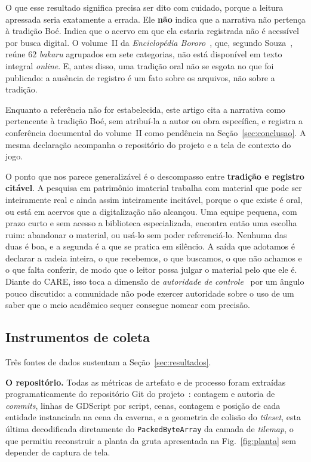 \documentclass[conference]{IEEEtran}
\begin{document}
O que esse resultado significa precisa ser dito com cuidado, porque a leitura apressada
seria exatamente a errada. Ele \textbf{não} indica que a narrativa não pertença à tradição
Boé. Indica que o acervo em que ela estaria registrada não é acessível por busca digital.
O volume~II da \textit{Enciclopédia Bororo}~\cite{albisetti1969}, que, segundo
Souza~\cite{souzabakaru}, reúne 62 \textit{bakaru} agrupados em sete categorias, não está
disponível em texto integral \textit{online}. E, antes disso, uma tradição oral não se
esgota no que foi publicado: a ausência de registro é um fato sobre os arquivos, não sobre
a tradição.

Enquanto a referência não for estabelecida, este artigo cita a narrativa como pertencente
à tradição Boé, sem atribuí-la a autor ou obra específica, e registra a conferência
documental do volume~II como pendência na Seção~\ref{sec:conclusao}. A mesma declaração
acompanha o repositório do projeto e a tela de contexto do jogo.

O ponto que nos parece generalizável é o descompasso entre \textbf{tradição e registro
citável}. A pesquisa em patrimônio imaterial trabalha com material que pode ser
inteiramente real e ainda assim inteiramente incitável, porque o que existe é oral, ou
está em acervos que a digitalização não alcançou. Uma equipe pequena, com prazo curto e
sem acesso a biblioteca especializada, encontra então uma escolha ruim: abandonar o
material, ou usá-lo sem poder referenciá-lo. Nenhuma das duas é boa, e a segunda é a que
se pratica em silêncio. A saída que adotamos é declarar a cadeia inteira, o que recebemos,
o que buscamos, o que não achamos e o que falta conferir, de modo que o leitor possa julgar
o material pelo que ele é. Diante do CARE, isso toca a dimensão de \textit{autoridade de
controle}~\cite{carroll2020} por um ângulo pouco discutido: a comunidade não pode exercer
autoridade sobre o uso de um saber que o meio acadêmico sequer consegue nomear com
precisão.

\subsection{Instrumentos de coleta}

Três fontes de dados sustentam a Seção~\ref{sec:resultados}.

\textbf{O repositório.} Todas as métricas de artefato e de processo foram extraídas
programaticamente do repositório Git do projeto~\cite{repo2026}: contagem e autoria de
\textit{commits}, linhas de GDScript por script, cenas, contagem e posição de cada
entidade instanciada na cena da caverna, e a geometria de colisão do \textit{tileset},
esta última decodificada diretamente do \texttt{PackedByteArray} da camada de
\textit{tilemap}, o que permitiu reconstruir a planta da gruta apresentada na
Fig.~\ref{fig:planta} sem depender de captura de tela.
\end{document}
